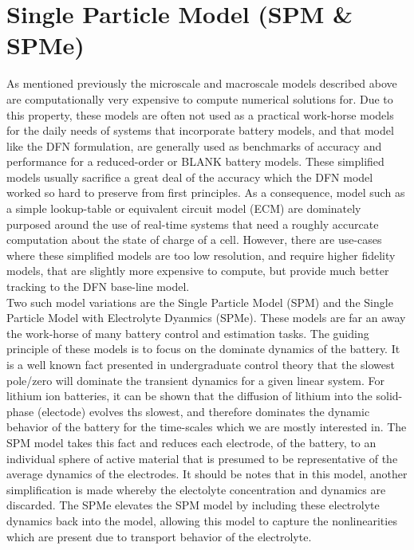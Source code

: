 \documentclass[lettersize,journal]{IEEEtran}
\begin{document}
\section{Single Particle Model (SPM \& SPMe)}

As mentioned previously the microscale and macroscale models described above are computationally very expensive to compute numerical solutions for. Due to this property, these models are often not used as a practical work-horse models for the daily needs of systems that incorporate battery models, and that model like the DFN formulation, are generally used as benchmarks of accuracy and performance for a reduced-order or BLANK battery models. These simplified models usually sacrifice a great deal of the accuracy which the DFN model worked so hard to preserve from first principles. As a consequence, model such as a simple lookup-table or equivalent circuit model (ECM) are dominately purposed around the use of real-time systems that need a roughly accurcate computation about the state of charge of a cell. However, there are use-cases where these simplified models are too low resolution, and require higher fidelity models, that are slightly more expensive to compute, but provide much better tracking to the DFN base-line model. \\

Two such model variations are the Single Particle Model (SPM) and the Single Particle Model with Electrolyte Dyanmics (SPMe). These models are far an away the work-horse of many battery control and estimation tasks. The guiding principle of these models is to focus on the dominate dynamics of the battery. It is a well known fact presented in undergraduate control theory that the slowest pole/zero will dominate the transient dynamics for a given linear system. For lithium ion batteries, it can be shown that the diffusion of lithium into the solid-phase (electode) evolves ths slowest, and therefore dominates the dynamic behavior of the battery for the time-scales which we are mostly interested in. The SPM model takes this fact and reduces each electrode, of the battery, to an individual sphere of active material that is presumed to be representative of the average dynamics of the electrodes. It should be notes that in this model, another simplification is made whereby the electolyte concentration and dynamics are discarded. The SPMe elevates the SPM model by including these electrolyte dynamics back into the model, allowing this model to capture the nonlinearities which are present due to transport behavior of the electrolyte.
\end{document}
